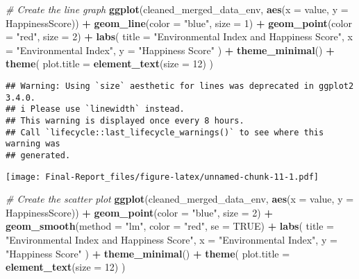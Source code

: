 \documentclass[
]{article}
\newenvironment{Shaded}{\begin{snugshade}}{\end{snugshade}}
\newcommand{\AttributeTok}[1]{\textcolor[rgb]{0.13,0.29,0.53}{#1}}
\newcommand{\CommentTok}[1]{\textcolor[rgb]{0.56,0.35,0.01}{\textit{#1}}}
\newcommand{\ConstantTok}[1]{\textcolor[rgb]{0.56,0.35,0.01}{#1}}
\newcommand{\DecValTok}[1]{\textcolor[rgb]{0.00,0.00,0.81}{#1}}
\newcommand{\FunctionTok}[1]{\textcolor[rgb]{0.13,0.29,0.53}{\textbf{#1}}}
\newcommand{\NormalTok}[1]{#1}
\newcommand{\SpecialCharTok}[1]{\textcolor[rgb]{0.81,0.36,0.00}{\textbf{#1}}}
\newcommand{\StringTok}[1]{\textcolor[rgb]{0.31,0.60,0.02}{#1}}
\begin{document}
\begin{Shaded}
\begin{Highlighting}[]
\CommentTok{\# Create the line graph}
\FunctionTok{ggplot}\NormalTok{(cleaned\_merged\_data\_env, }\FunctionTok{aes}\NormalTok{(}\AttributeTok{x =}\NormalTok{ value, }\AttributeTok{y =}\NormalTok{ HappinessScore)) }\SpecialCharTok{+}
  \FunctionTok{geom\_line}\NormalTok{(}\AttributeTok{color =} \StringTok{"blue"}\NormalTok{, }\AttributeTok{size =} \DecValTok{1}\NormalTok{) }\SpecialCharTok{+}  
  \FunctionTok{geom\_point}\NormalTok{(}\AttributeTok{color =} \StringTok{"red"}\NormalTok{, }\AttributeTok{size =} \DecValTok{2}\NormalTok{) }\SpecialCharTok{+} 
  \FunctionTok{labs}\NormalTok{(}
    \AttributeTok{title =} \StringTok{"Environmental Index and Happiness Score"}\NormalTok{,}
    \AttributeTok{x =} \StringTok{"Environmental Index"}\NormalTok{,}
    \AttributeTok{y =} \StringTok{"Happiness Score"}
\NormalTok{  ) }\SpecialCharTok{+}
  \FunctionTok{theme\_minimal}\NormalTok{() }\SpecialCharTok{+} 
  \FunctionTok{theme}\NormalTok{(}
    \AttributeTok{plot.title =} \FunctionTok{element\_text}\NormalTok{(}\AttributeTok{size =} \DecValTok{12}\NormalTok{) }
\NormalTok{  )}
\end{Highlighting}
\end{Shaded}

\begin{verbatim}
## Warning: Using `size` aesthetic for lines was deprecated in ggplot2 3.4.0.
## i Please use `linewidth` instead.
## This warning is displayed once every 8 hours.
## Call `lifecycle::last_lifecycle_warnings()` to see where this warning was
## generated.
\end{verbatim}

\texttt{[image: Final-Report\_files/figure-latex/unnamed-chunk-11-1.pdf]}

\begin{Shaded}
\begin{Highlighting}[]
\CommentTok{\# Create the scatter plot}
\FunctionTok{ggplot}\NormalTok{(cleaned\_merged\_data\_env, }\FunctionTok{aes}\NormalTok{(}\AttributeTok{x =}\NormalTok{ value, }\AttributeTok{y =}\NormalTok{ HappinessScore)) }\SpecialCharTok{+}
  \FunctionTok{geom\_point}\NormalTok{(}\AttributeTok{color =} \StringTok{"blue"}\NormalTok{, }\AttributeTok{size =} \DecValTok{2}\NormalTok{) }\SpecialCharTok{+}               
  \FunctionTok{geom\_smooth}\NormalTok{(}\AttributeTok{method =} \StringTok{"lm"}\NormalTok{, }\AttributeTok{color =} \StringTok{"red"}\NormalTok{, }\AttributeTok{se =} \ConstantTok{TRUE}\NormalTok{) }\SpecialCharTok{+} 
  \FunctionTok{labs}\NormalTok{(}
    \AttributeTok{title =} \StringTok{"Environmental Index and Happiness Score"}\NormalTok{,}
    \AttributeTok{x =} \StringTok{"Environmental Index"}\NormalTok{,}
    \AttributeTok{y =} \StringTok{"Happiness Score"}
\NormalTok{  ) }\SpecialCharTok{+}
  \FunctionTok{theme\_minimal}\NormalTok{() }\SpecialCharTok{+} 
  \FunctionTok{theme}\NormalTok{(}
    \AttributeTok{plot.title =} \FunctionTok{element\_text}\NormalTok{(}\AttributeTok{size =} \DecValTok{12}\NormalTok{) }
\NormalTok{  )}
\end{Highlighting}
\end{Shaded}
\end{document}
